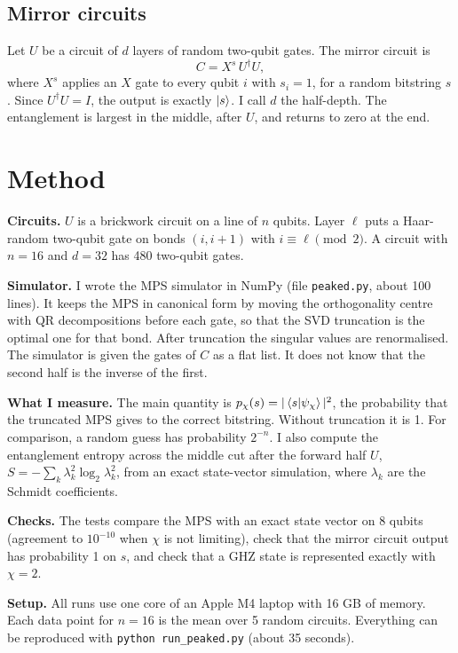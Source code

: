 \documentclass[11pt,a4paper]{article}
\begin{document}
\subsection{Mirror circuits}

Let $U$ be a circuit of $d$ layers of random two-qubit gates. The mirror circuit is
\begin{equation}
C = X^{s}\, U^{\dagger} U ,
\end{equation}
where $X^{s}$ applies an $X$ gate to every qubit $i$ with $s_i=1$, for a random bitstring
$s$. Since $U^\dagger U = I$, the output is exactly $\ket{s}$. I call $d$ the half-depth.
The entanglement is largest in the middle, after $U$, and returns to zero at the end.

\section{Method}

\textbf{Circuits.} $U$ is a brickwork circuit on a line of $n$ qubits. Layer $\ell$ puts a
Haar-random two-qubit gate on bonds $(i,i+1)$ with $i\equiv\ell \pmod 2$. A circuit with
$n=16$ and $d=32$ has 480 two-qubit gates.

\textbf{Simulator.} I wrote the MPS simulator in NumPy (file \texttt{peaked.py}, about 100
lines). It keeps the MPS in canonical form by moving the orthogonality centre with QR
decompositions before each gate, so that the SVD truncation is the optimal one for that
bond. After truncation the singular values are renormalised. The simulator is given the
gates of $C$ as a flat list. It does not know that the second half is the inverse of the
first.

\textbf{What I measure.} The main quantity is $p_\chi(s)=|\braket{s|\psi_\chi}|^2$, the
probability that the truncated MPS gives to the correct bitstring. Without truncation it is
1. For comparison, a random guess has probability $2^{-n}$. I also compute the
entanglement entropy across the middle cut after the forward half $U$,
$S=-\sum_k \lambda_k^2 \log_2 \lambda_k^2$, from an exact state-vector simulation, where
$\lambda_k$ are the Schmidt coefficients.

\textbf{Checks.} The tests compare the MPS with an exact state vector on 8 qubits (agreement
to $10^{-10}$ when $\chi$ is not limiting), check that the mirror circuit output has
probability 1 on $s$, and check that a GHZ state is represented exactly with $\chi=2$.

\textbf{Setup.} All runs use one core of an Apple M4 laptop with 16 GB of memory. Each data
point for $n=16$ is the mean over 5 random circuits. Everything can be reproduced with
\texttt{python run\_peaked.py} (about 35 seconds).
\end{document}
